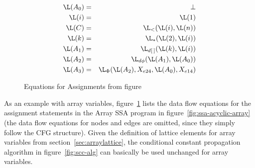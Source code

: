 \begin{figure}%
\begin{eqnarray*}
\L(A_0) & = & \bot \\
\L(i) & = & \L(1) \\
\L(C) & = & \L_{<}(\L(i),\L(n))  \\
\L(k) & = & \L_{*}(\L(2), \L(i)) \\
\L(A_1) & = & \L_{d[\:]}(\L(k), \L(i)) \\
\L(A_2) & = & \L_{d\phi}(\L(A_1), \L(A_0)) \\
\L(A_3) & = & \L_{\Phi}(\L(A_2), X_{e24}, \L(A_0), X_{e14}) \\
\end{eqnarray*}
\caption{Equations for Assignments from figure \protect{\ref{fig:ssa-acyclic-array}}}
\label{fig:equations-array}
\end{figure}


As an example with array variables, figure~\ref{fig:equations-array} lists the data flow
equations for the assignment statements in the Array SSA program in
figure~\ref{fig:ssa-acyclic-array} (the data flow equations for nodes
and edges are omitted, since they
simply follow the CFG structure).
Given the definition of lattice elements for
array variables from section~\ref{sec:arraylattice},
the conditional constant propagation algorithm
in figure~\ref{fig:scc-alg} can basically be used unchanged for  
array variables.

